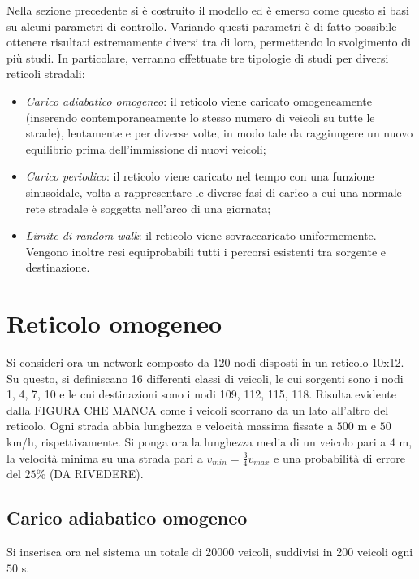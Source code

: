 \documentclass[../main.tex]{subfiles}
\begin{document}
Nella sezione precedente si \`e costruito il modello ed \`e emerso come questo si basi su alcuni parametri di controllo.
Variando questi parametri \`e di fatto possibile ottenere risultati estremamente diversi tra di loro, permettendo lo svolgimento di pi\`u studi.
In particolare, verranno effettuate tre tipologie di studi per diversi reticoli stradali:
\begin{itemize}
    \item \emph{Carico adiabatico omogeneo}: il reticolo viene caricato omogeneamente (inserendo contemporaneamente lo stesso numero di veicoli su tutte le strade), lentamente e per diverse volte, in modo tale da raggiungere un nuovo equilibrio prima dell'immissione di nuovi veicoli;
    \item \emph{Carico periodico}: il reticolo viene caricato nel tempo con una funzione sinusoidale, volta a rappresentare le diverse fasi di carico a cui una normale rete stradale \`e soggetta nell'arco di una giornata;
    \item \emph{Limite di random walk}: il reticolo viene sovraccaricato uniformemente. Vengono inoltre resi equiprobabili tutti i percorsi esistenti tra sorgente e destinazione.
\end{itemize}

\section{Reticolo omogeneo}
Si consideri ora un network composto da 120 nodi disposti in un reticolo 10x12.
Su questo, si definiscano 16 differenti classi di veicoli, le cui sorgenti sono i nodi 1, 4, 7, 10 e le cui destinazioni sono i nodi 109, 112, 115, 118.
Risulta evidente dalla FIGURA CHE MANCA come i veicoli scorrano da un lato all'altro del reticolo.
Ogni strada abbia lunghezza e velocit\`a massima fissate a $500$ m e $50$ km/h, rispettivamente.
Si ponga ora la lunghezza media di un veicolo pari a $4$ m, la velocit\`a minima su una strada pari a $v_{min}=\frac{3}{4}v_{max}$ e una probabilit\`a di errore del $25$\% (DA RIVEDERE).

\subsection{Carico adiabatico omogeneo}
Si inserisca ora nel sistema un totale di 20000 veicoli, suddivisi in 200 veicoli ogni $50$ s.
\end{document}
